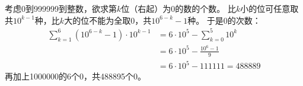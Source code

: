 \begin{solution}
    考虑0到999999到整数，欲求第$k$位（右起）为0的数的个数。
    比$k$小的位可任意取共$10^{k-1}$种，比$k$大的位不能为全取0，共$10^{6-k}-1$种。
    于是0的次数：
    \begin{align*}
        \sum_{k=1}^6(10^{6-k}-1)\cdot 10^{k-1} &= 6\cdot 10^5-\sum_{k=0}^5 10^k\\
        &= 6\cdot 10^5 - \frac{10^6-1}{9}\\
        &= 6\cdot 10^5 - 111111 = 488889
    \end{align*}
    再加上1000000的6个0，共488895个0。
\end{solution}